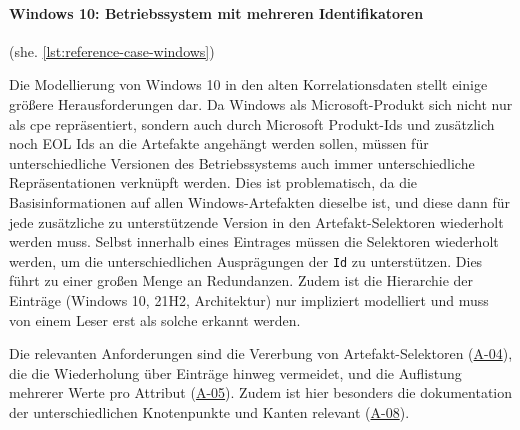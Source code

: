 \paragraph{Windows 10: Betriebssystem mit mehreren Identifikatoren}\label{par:reference-case-windows} (she. \autoref{lst:reference-case-windows})

Die Modellierung von Windows 10 in den alten Korrelationsdaten stellt einige größere Herausforderungen dar.
Da Windows als Microsoft-Produkt sich nicht nur als \acrshort{cpe} repräsentiert, sondern auch durch Microsoft Produkt-Ids und zusätzlich noch EOL Ids an die Artefakte angehängt werden sollen, müssen für unterschiedliche Versionen des Betriebssystems auch immer unterschiedliche Repräsentationen verknüpft werden.
Dies ist problematisch, da die Basisinformationen auf allen Windows-Artefakten dieselbe ist, und diese dann für jede zusätzliche zu unterstützende Version in den Artefakt-Selektoren wiederholt werden muss.
Selbst innerhalb eines Eintrages müssen die Selektoren wiederholt werden, um die unterschiedlichen Ausprägungen der \texttt{Id} zu unterstützen.
Dies führt zu einer großen Menge an Redundanzen.
Zudem ist die Hierarchie der Einträge (Windows 10, 21H2, Architektur) nur impliziert modelliert und muss von einem Leser erst als solche erkannt werden.

Die relevanten Anforderungen sind die Vererbung von Artefakt-Selektoren (\hyperref[subsec:req-selektor-inheritance]{A-04}), die die Wiederholung über Einträge hinweg vermeidet, und die Auflistung mehrerer Werte pro Attribut (\hyperref[subsec:req-multiple-attribute-values]{A-05}).
Zudem ist hier besonders die dokumentation der unterschiedlichen Knotenpunkte und Kanten relevant (\hyperref[subsec:req-reason-format]{A-08}).


